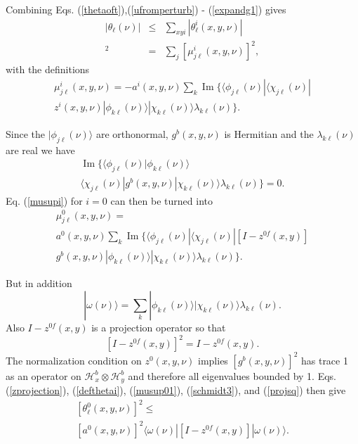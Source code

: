 \documentclass[12pt,amsmath,amssymb,onecolumn]{revtex4-2}
\begin{document}
Combining Eqs. (\ref{thetaoft}),(\ref{ufromperturb}) - (\ref{expandg1}) gives
\begin{subequations}
\begin{eqnarray}
\label{thetasum}
|\theta_\ell(\nu)| &\le& \sum_{xyi}|\theta^i_{\ell}(x,y,\nu)|\\ 
\label{defthetai}
[\theta^i_{\ell}( x,y,\nu)]^2 & = & \sum_j [ \mu^i_{j\ell}(x,y,\nu)]^2,
\end{eqnarray}
\end{subequations}
with the definitions
\begin{multline}
\label{musupi}
\mu^i_{j\ell}(x,y,\nu) =  -a^i(x,y,\nu) \sum_k \operatorname{Im}\{ 
 \langle \phi_{j\ell}(\nu)| \langle \chi_{j\ell}(\nu)| \\
z^i(x,y,\nu)|\phi_{k\ell}(\nu) \rangle |\chi_{k\ell}(\nu) \rangle  \lambda_{k\ell}(\nu)\}.
\end{multline}



Since the  $|\phi_{j\ell}(\nu) \rangle $ are orthonormal,
$g^b(x,y,\nu)$ is Hermitian
and the $\lambda_{k\ell}(\nu)$ are real
we have
\begin{multline}
\label{isup01}
\operatorname{Im}\{
 \langle \phi_{j\ell}(\nu)|\phi_{k\ell}(\nu) \rangle \\ \langle \chi_{j\ell}(\nu)|g^b(x,y,\nu)|\chi_{k\ell}(\nu) \rangle  \lambda_{k\ell}(\nu)\} = 0.
\end{multline}
Eq. (\ref{musupi}) for $i = 0$ can then be turned into
\begin{multline}
\label{musup01}
\mu^0_{j\ell}(x,y,\nu) = \\ a^0(x,y,\nu) \sum_k 
 \operatorname{Im}\{
 \langle \phi_{j\ell}(\nu)| \langle \chi_{j\ell}(\nu)| 
[I - z^{0f}(x,y)] \\g^b(x,y,\nu) 
|\phi_{k\ell}(\nu) \rangle |\chi_{k\ell}(\nu) \rangle  \lambda_{k\ell}(\nu)\}.
\end{multline}



But in addition
\begin{equation}
\label{schmidt3}
|\omega( \nu) \rangle  = \sum_k |\phi_{k\ell}(\nu) \rangle |\chi_{k\ell}(\nu) \rangle  \lambda_{k\ell}(\nu).
\end{equation}
Also $I - z^{0f}(x,y)$ is a projection operator so that
\begin{equation}
\label{projsq}
[I - z^{0f}(x,y)]^2 = I - z^{0f}(x,y).
\end{equation}
The normalization condition on $z^0(x,y,\nu)$ implies 
$[g^b(x,y,\nu)]^2$ has trace 1 as an operator on
$\mathcal{H}^b_x \otimes \mathcal{H}^b_y$
and therefore all eigenvalues bounded by 1.
Eqs. (\ref{zprojection}), (\ref{defthetai}), (\ref{musup01}), (\ref{schmidt3}), and
(\ref{projsq}) then give
\begin{multline}
\label{theta0bound}
[\theta^0_{\ell}(x,y,\nu)]^2 \le \\ [a^0(x,y,\nu)]^2  \langle  \omega(\nu)|[I - z^{0f}(x,y)]|\omega(\nu) \rangle .
\end{multline}
\end{document}
